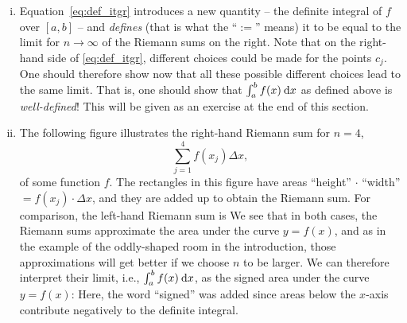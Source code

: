 \begin{remark}
\label{rem:def_int}
\begin{enumerate}[(i)]
	\item Equation~\eqref{eq:def_itgr} introduces a new quantity -- the definite integral of $f$ over $[a,b]$ -- and \emph{defines} (that is what the ``$:=$'' means) it to be equal to the limit for $n \rightarrow \infty$ of the Riemann sums on the right. Note that on the right-hand side of \eqref{eq:def_itgr}, different choices could be made for the points $c_j$. One should therefore show now that all these possible different choices lead to the same limit. That is, one should show that $\int_{a}^{b} f(x) \: \mathrm{d} x$ as defined above is \emph{well-defined}! This will be given as an exercise at the end of this section.
	\item The following figure illustrates the right-hand Riemann sum for $n=4$, 
	\[ \sum_{j=1}^{4} f(x_j) \Delta x, \]
	of some function $f$.
	The rectangles in this figure have areas ``height'' $\cdot$ ``width'' 
	$= f(x_j)\cdot \Delta x$, and they are added up to obtain the Riemann sum. For comparison, the left-hand Riemann sum is
	We see that in both cases, the Riemann sums approximate the area under the curve $y=f(x)$, and as in the example of the oddly-shaped room in the introduction, those approximations will get better if we choose $n$ to be larger. We can therefore interpret their limit, i.e., $\int_{a}^{b} f(x) \: \mathrm{d} x$, as the signed area under the curve $y=f(x)$:
	Here, the word ``signed'' was added since areas below the $x$-axis contribute negatively to the definite integral.
\end{enumerate}
\end{remark}

